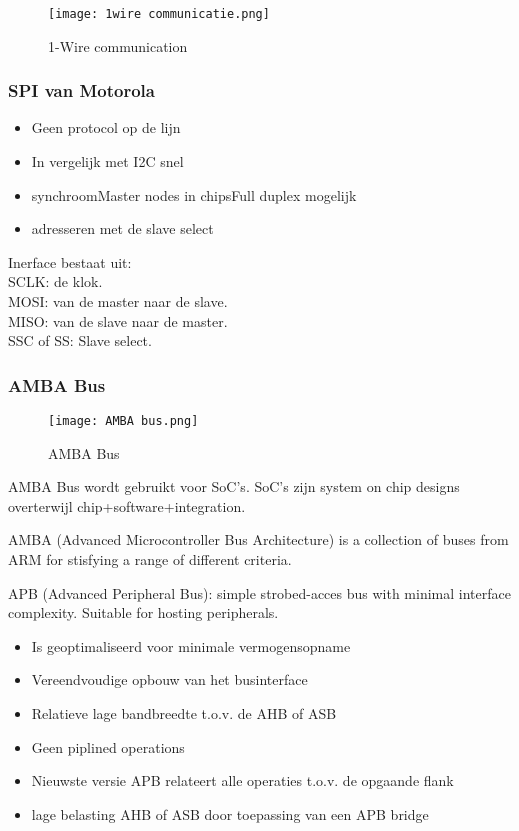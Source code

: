 \begin{figure}[H]
    \centering
    \texttt{[image: 1wire communicatie.png]}
    \caption*{1-Wire communication}
    \end{figure}

\subsubsection{SPI van Motorola}
\begin{itemize}
    \item Geen protocol op de lijn
    \item In vergelijk met I2C snel
    \item synchroomMaster nodes in chipsFull duplex mogelijk
    \item adresseren met de slave select
\end{itemize}

Inerface bestaat uit:\\
SCLK: de klok.\\
MOSI: van de master naar de slave.\\
MISO: van de slave naar de master.\\
SSC of SS: Slave select.

\subsubsection{AMBA Bus}
\begin{figure}[H]
    \centering
    \texttt{[image: AMBA bus.png]}
    \caption*{AMBA Bus}
    \end{figure}

AMBA Bus wordt gebruikt voor SoC's. SoC's zijn system on chip designs overterwijl chip+software+integration.

\vspace{0.5cm}
AMBA (Advanced Microcontroller Bus Architecture) is a collection of buses from ARM for stisfying a range of different criteria.

APB (Advanced Peripheral Bus): simple strobed-acces bus with minimal interface complexity. Suitable for hosting peripherals.
\begin{itemize}
    \item Is geoptimaliseerd voor minimale vermogensopname
    \item Vereendvoudige opbouw van het businterface
    \item Relatieve lage bandbreedte t.o.v. de AHB of ASB
    \item Geen piplined operations
    \item Nieuwste versie APB relateert alle operaties t.o.v. de opgaande flank
    \item lage belasting AHB of ASB door toepassing van een APB bridge
\end{itemize}

